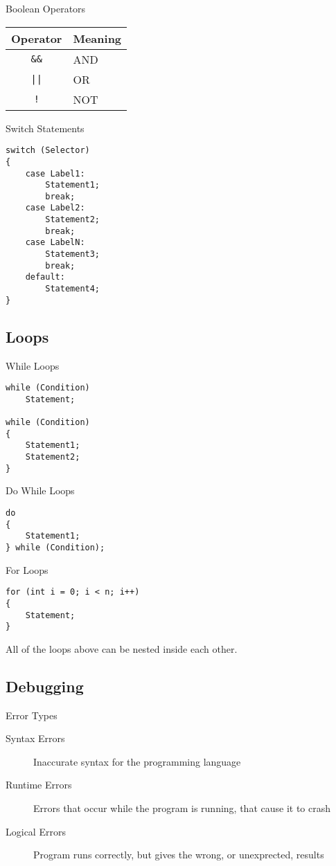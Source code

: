 \documentclass[\main/notes.tex]{subfiles}
\begin{document}
				\begin{sidenote}{Boolean Operators}
					\begin{center}
						\begin{tabular}{cl}
							Operator & Meaning\\
							\midrule
							\texttt{\&\&} & AND\\
							\texttt{||} & OR\\
							\texttt{!} & NOT
						\end{tabular}
					\end{center}
				\end{sidenote}
				\begin{codebox}{Switch Statements}
					\begin{verbatim}
switch (Selector)
{
    case Label1:
        Statement1;
        break;
    case Label2:
        Statement2;
        break;
    case LabelN:
        Statement3;
        break;
    default:
        Statement4;
}
					\end{verbatim}
				\end{codebox}

			\subsection*{Loops}
				\begin{codebox}{While Loops}
					\begin{verbatim}
while (Condition)
    Statement;

while (Condition)
{
    Statement1;
    Statement2;
}
					\end{verbatim}
				\end{codebox}
				\begin{codebox}{Do While Loops}
					\begin{verbatim}
do
{
    Statement1;
} while (Condition);
					\end{verbatim}
				\end{codebox}
				\begin{codebox}{For Loops}
					\begin{verbatim}
for (int i = 0; i < n; i++)
{
    Statement;
}
					\end{verbatim}
				\end{codebox}
				All of the loops above can be nested inside each other.

			\subsection*{Debugging}
				\begin{definition}{Error Types}
					\begin{description}
						\item[Syntax Errors] Inaccurate syntax for the programming language
						\item[Runtime Errors] Errors that occur while the program is running, that cause it to crash
						\item[Logical Errors] Program runs correctly, but gives the wrong, or unexprected, results
					\end{description}
				\end{definition}
\end{document}
